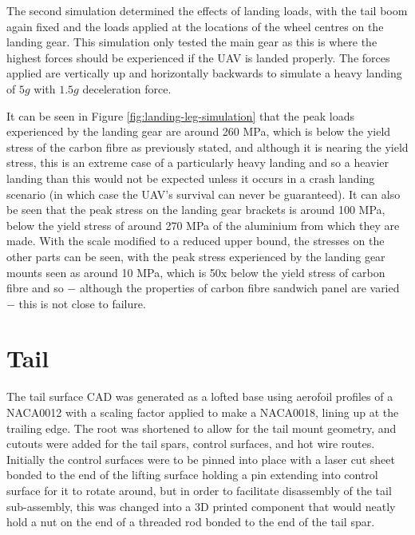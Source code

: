 \documentclass[../../main.tex]{subfiles}
\begin{document}
The second simulation determined the effects of landing loads, with the tail boom again fixed and the loads applied at the locations of the wheel centres on the landing gear.
This simulation only tested the main gear as this is where the highest forces should be experienced if the UAV is landed properly.
The forces applied are  vertically up and  horizontally backwards to simulate a heavy landing of $5g$ with $1.5g$ deceleration force. 

It can be seen in Figure \ref{fig:landing-leg-simulation} that the peak loads experienced by the landing gear are around 260 MPa, which is below the yield stress of the carbon fibre as previously stated, and although it is nearing the yield stress, this is an extreme case of a particularly heavy landing and so a heavier landing than this would not be expected unless it occurs in a crash landing scenario (in which case the UAV's survival can never be guaranteed).
It can also be seen that the peak stress on the landing gear brackets is around 100 MPa, below the yield stress of around 270 MPa of the aluminium from which they are made.
With the scale modified to a reduced upper bound, the stresses on the other parts can be seen, with the peak stress experienced by the landing gear mounts seen as around 10 MPa, which is 50x below the yield stress of carbon fibre and so $-$ although the properties of carbon fibre sandwich panel are varied $-$ this is not close to failure. 

\section{Tail} \label{sec:final-design-proposal:tail}


The tail surface CAD was generated as a lofted base using aerofoil profiles of a NACA0012 with a scaling factor applied to make a NACA0018, lining up at the trailing edge.
The root was shortened to allow for the tail mount geometry, and cutouts were added for the tail spars, control surfaces, and hot wire routes.
Initially the control surfaces were to be pinned into place with a laser cut sheet bonded to the end of the lifting surface holding a pin extending into control surface for it to rotate around, but in order to facilitate disassembly of the tail sub-assembly, this was changed into a 3D printed component that would neatly hold a nut on the end of a threaded rod bonded to the end of the tail spar.
\end{document}
